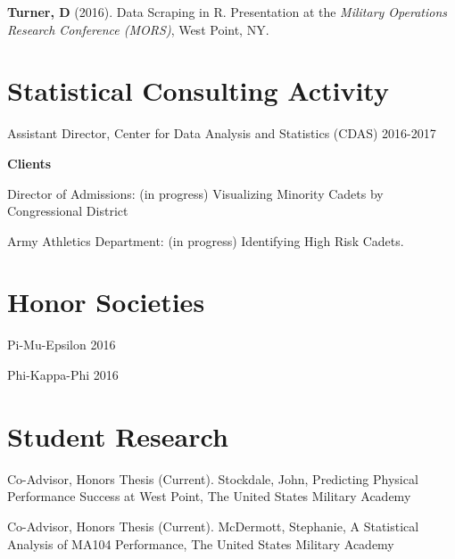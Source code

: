 \documentclass[11pt,]{article}
\providecommand{\tightlist}{%
  \setlength{\itemsep}{0pt}\setlength{\parskip}{0pt}}
\renewenvironment{itemize}{
  \begin{list}{}{
    \setlength{\leftmargin}{1.5em}
  }
}{
  \end{list}
}
\begin{document}
\begin{itemize}
\tightlist
\item
  \textbf{Turner, D} (2016). Data Scraping in R. Presentation at the
  \emph{Military Operations Research Conference (MORS)}, West Point, NY.
\end{itemize}

\hypertarget{statistical-consulting-activity}{%
\section{Statistical Consulting
Activity}\label{statistical-consulting-activity}}

\begin{itemize}
\tightlist
\item
  Assistant Director, Center for Data Analysis and Statistics (CDAS)
  \hfill 2016-2017
\item
  \textbf{Clients}

  \begin{itemize}
  \tightlist
  \item
    Director of Admissions: (in progress) Visualizing Minority Cadets by
    Congressional District
  \item
    Army Athletics Department: (in progress) Identifying High Risk
    Cadets.
  \end{itemize}
\end{itemize}

\hypertarget{honor-societies}{%
\section{Honor Societies}\label{honor-societies}}

\begin{itemize}
\tightlist
\item
  Pi-Mu-Epsilon \hfill 2016
\item
  Phi-Kappa-Phi \hfill 2016
\end{itemize}

\hypertarget{student-research}{%
\section{Student Research}\label{student-research}}

\begin{itemize}
\tightlist
\item
  Co-Advisor, Honors Thesis (Current). Stockdale, John, Predicting
  Physical Performance Success at West Point, The United States Military
  Academy
\item
  Co-Advisor, Honors Thesis (Current). McDermott, Stephanie, A
  Statistical Analysis of MA104 Performance, The United States Military
  Academy
\end{itemize}
\end{document}
